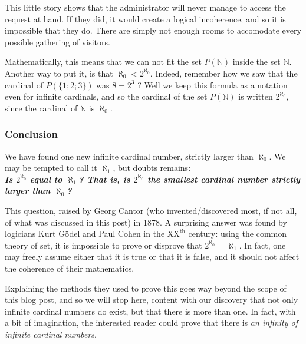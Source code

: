 \documentclass[
]{article}
\begin{document}
This little story shows that the administrator will never manage to
access the request at hand. If they did, it would create a logical
incoherence, and so it is impossible that they do. There are simply not
enough rooms to accomodate every possible gathering of visitors.

Mathematically, this means that we can not fit the set \(P(\mathbb{N})\)
inside the set \(\mathbb{N}\). Another way to put it, is that
\(\aleph_0 < 2^{\aleph_0}\). Indeed, remember how we saw that the
cardinal of \(P(\{1;2;3\})\) was \(8 = 2^3\) ? Well we keep this formula
as a notation even for infinite cardinals, and so the cardinal of the
set \(P(\mathbb{N})\) is written \(2^{\aleph_0}\), since the cardinal of
\(\mathbb{N}\) is \(\aleph_0\).

\hypertarget{conclusion}{%
\subsubsection{Conclusion}\label{conclusion}}

We have found one new infinite cardinal number, strictly larger than
\(\aleph_0\). We may be tempted to call it \(\aleph_1\), but doubts
remains:\\
\textbf{\emph{Is \(2^{\aleph_0}\) equal to \(\aleph_1\)? That is, is
\(2^{\aleph_0}\) the smallest cardinal number strictly larger than
\(\aleph_0\)?}}

This question, raised by Georg Cantor (who invented/discovered most, if
not all, of what was discussed in this post) in 1878. A surprising
answer was found by logicians Kurt Gödel and Paul Cohen in the
\(\text{XX}^{\text{th}}\) century: using the common theory of set, it is
impossible to prove or disprove that \(2^{\aleph_0} = \aleph_1\). In
fact, one may freely assume either that it is true or that it is false,
and it should not affect the coherence of their mathematics.

Explaining the methods they used to prove this goes way beyond the scope
of this blog post, and so we will stop here, content with our discovery
that not only infinite cardinal numbers do exist, but that there is more
than one. In fact, with a bit of imagination, the interested reader
could prove that there is \emph{an infinity of infinite cardinal
numbers}.
\end{document}
